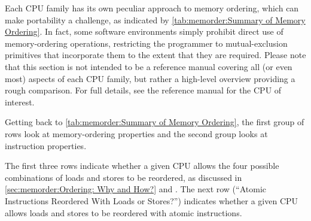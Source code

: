 \begin{table}[tb]
\vspace{5pt}\hfill
{}\OneColumnHSpace{-0.4in}
\caption{Summary of Memory Ordering}
\label{tab:memorder:Summary of Memory Ordering}
\end{table}

Each CPU family has its own peculiar approach to memory ordering, which
can make portability a challenge, as indicated by
\cref{tab:memorder:Summary of Memory Ordering}.
In fact, some software environments simply prohibit
direct use of memory-ordering operations, restricting the programmer
to mutual-exclusion primitives that incorporate them to the extent that
they are required.  Please note that this section is not intended to be
a reference manual
covering all (or even most) aspects of each CPU family, but rather
a high-level overview providing a rough comparison.
For full details, see the reference manual for the CPU of interest.

Getting back to
\cref{tab:memorder:Summary of Memory Ordering},
the first group of rows look at memory-ordering
properties and the second group looks at instruction properties.

The first three rows indicate whether a given CPU allows the four
possible combinations of loads and stores to be reordered, as discussed
in
\cref{sec:memorder:Ordering: Why and How?} and
.
The next row (``Atomic Instructions Reordered With Loads or Stores?'')
indicates whether a given CPU allows loads and stores
to be reordered with atomic instructions.

